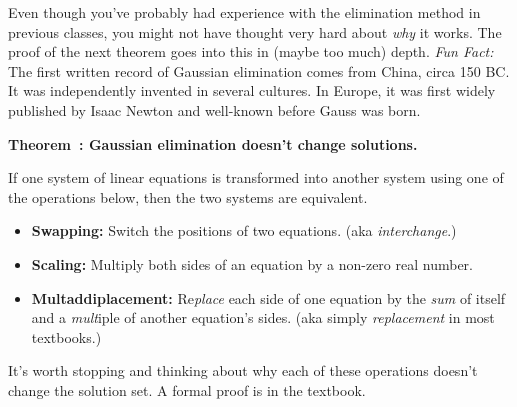 \documentclass[11pt, letterpaper]{report}
\newenvironment{notes}{}{}
\newcounter{theorem}[chapter]
\newenvironment{theorem}[1][]{\refstepcounter{theorem}\begin{bbox}\par
    \noindent\textbf{Theorem~\thetheorem: #1}}{\end{bbox}}
\newlength\oldfboxsep%
\newlength\myminiwidth%
\newenvironment{bbox}{%
  \setlength\oldfboxsep\fboxsep
  \setlength{\fboxsep}{.1in}%
  \setlength\myminiwidth\linewidth%
  \addtolength\myminiwidth{-0.2in}%
  \vspace{0.1in}%
  \begin{lrbox}{\bboxbox}\begin{minipage}{\myminiwidth}%
    }{%
    \end{minipage}\end{lrbox}%
  \noindent\fbox{\usebox{\bboxbox}}\vspace{0.1in}\setlength\fboxsep\oldfboxsep%
}
\begin{document}
Even though you've probably had experience with the elimination method in previous classes, you might not have thought very hard about \emph{why} it works. The proof of the next theorem goes into this in (maybe too much) depth. \emph{Fun Fact:} The first written record of Gaussian elimination comes from China, circa 150 BC. It was independently invented in several cultures. In Europe, it was first widely published by Isaac Newton and well-known before Gauss was born.



\begin{theorem}[Gaussian elimination doesn't change solutions.]
  \label{theorem:gauss}

  If one system of linear equations is transformed into another system using one of the operations below, then the two systems are equivalent. 

  \begin{itemize}
  \item \textbf{Swapping:} Switch the positions of two equations. (aka \emph{interchange}.)
  \item \textbf{Scaling:} Multiply both sides of an equation by a non-zero real number.
  \item \textbf{Multaddiplacement:} Re\emph{place} each side of one equation by the \emph{sum} of itself and a \emph{mult}iple of another equation's sides. (aka simply \emph{replacement} in most textbooks.)
  \end{itemize}
\end{theorem}

\begin{notes}
It's worth stopping and thinking about why each of these operations doesn't change the solution set. A formal proof is in the textbook.
\end{notes}
\end{document}
